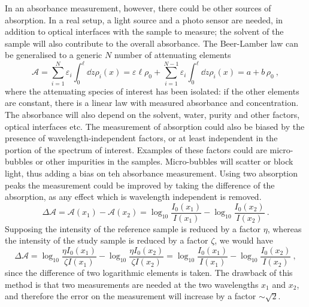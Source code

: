 In an absorbance measurement, however, there could be other sources of absorption.
In a real setup, a light source and a photo sensor are needed, in addition to optical interfaces with the %
sample to measure; the solvent of the sample will also contribute to the overall absorbance.
The Beer-Lamber law can be generalised to a generic $N$ number of attenuating elements
\begin{equation}
	\mathcal{A} = \sum_{i = 1}^N \varepsilon_i \int_0^\ell \dd{z} \rho_i (x) = %
	\varepsilon \ell \rho_0 +  \sum_{i = 1}^{N-1} \varepsilon_i \int_0^\ell \dd{z} \rho_i (x) = a + b \, \rho_0\ ,
\end{equation}
where the attenuating species of interest has been isolated: %
if the other elements are constant, there is a linear law with measured absorbance and concentration.
The absorbance will also depend on the solvent, \ie water, purity and other factors, \eg optical interfaces etc.
The measurement of absorption could also be biased by the presence of wavelength-independent factors, %
or at least independent in the portion of the spectrum of interest.
Examples of these factors could are micro-bubbles or other impurities in the samples.
Micro-bubbles will scatter or block light, thus adding a bias on teh absorbance measurement.
Using two absorption peaks the measurement could be improved by taking the difference of the absorption, %
as any effect which is wavelength independent is removed.
\begin{equation}
	\Delta \mathcal{A} = \mathcal{A}(x_1) - \mathcal{A}(x_2) = %
	\log_{10} \frac{I_0 (x_1)}{I(x_1)} - \log_{10} \frac{I_0 (x_2)}{I(x_2)}\ .
\end{equation}
Supposing the intensity of the reference sample is reduced by a factor $\eta$, %
whereas the intensity of the study sample is reduced by a factor $\zeta$, we would have
\begin{equation}
	\Delta \mathcal{A} = %
	\log_{10} \frac{\eta I_0 (x_1)}{\zeta I(x_1)} - \log_{10} \frac{\eta I_0 (x_2)}{\zeta I(x_2)} = %
	\log_{10} \frac{I_0 (x_1)}{I(x_1)} - \log_{10} \frac{I_0 (x_2)}{I(x_2)}\ ,
\end{equation}
since the difference of two logarithmic elements is taken.
The drawback of this method is that two measurements are needed at the two wavelengths $x_1$ and $x_2$, %
and therefore the error on the measurement will increase by a factor $\sim \sqrt{2}$.

\begin{figure}
	\centering
	\caption{}
	\label{}
\end{figure}

